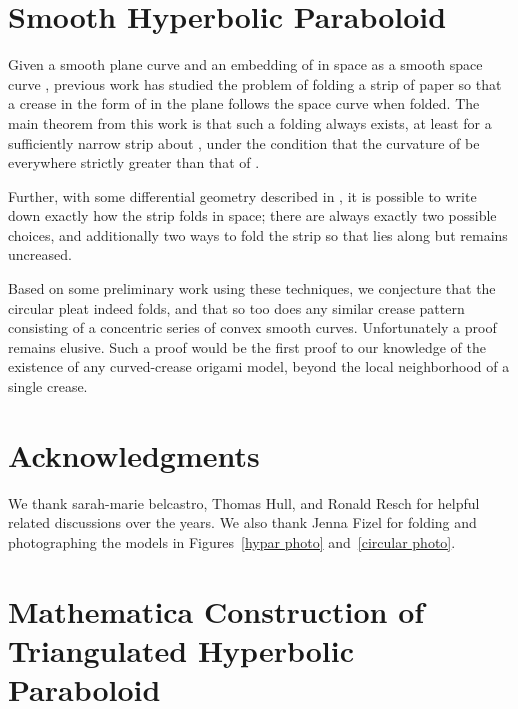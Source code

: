 \documentclass[11pt,letterpaper]{article}
\begin{document}
\section{Smooth Hyperbolic Paraboloid}

Given a smooth plane curve  and an embedding of  in
space as a smooth space curve , previous work
\cite{FuchsTabachnikov} has studied the problem of folding a strip of
paper so that a crease in the form of  in the plane follows
the space curve  when folded.  The main theorem from this work
is that such a folding always exists, at least for a sufficiently
narrow strip about , under the condition that the curvature of
 be everywhere strictly greater than that of .

Further, with some differential geometry described in
\cite{FuchsTabachnikov}, it is possible to write down exactly how the
strip folds in space; there are always exactly two possible choices,
and additionally two ways to fold the strip so that  lies
along  but remains uncreased.

Based on some preliminary work using these techniques, we conjecture
that the circular pleat indeed folds, and that so too does any similar crease
pattern consisting of a concentric series of convex smooth curves.
Unfortunately a proof remains elusive.  Such a proof would be the first
proof to our knowledge of the existence of any curved-crease origami model,
beyond the local neighborhood of a single crease.




\section*{Acknowledgments}

We thank sarah-marie belcastro, Thomas Hull, and Ronald Resch for
helpful related discussions over the years.
We also thank Jenna Fizel for folding and photographing the models
in Figures~\ref{hypar photo} and~\ref{circular photo}.








\appendix
\section{Mathematica Construction of Triangulated Hyperbolic Paraboloid}
\label{mathematica}

\begin{small}

\end{small}
\end{document}
